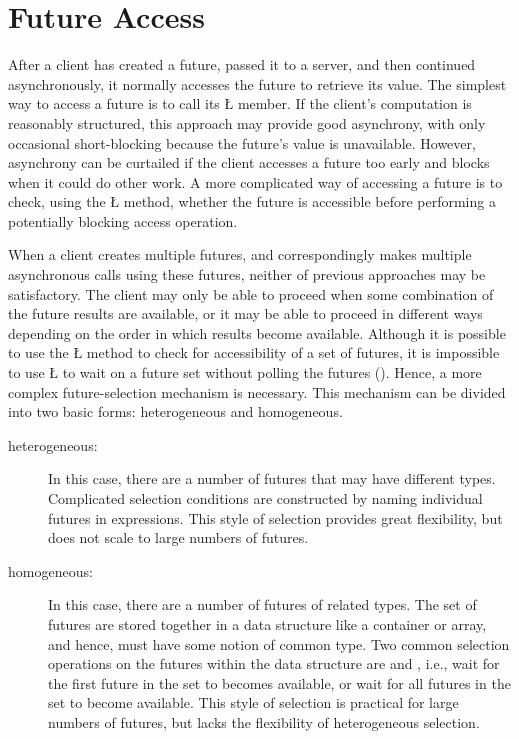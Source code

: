 \documentclass[openright,twoside]{report}
\begin{document}
\section{Future Access}

After a client has created a future, passed it to a server, and then continued asynchronously, it normally accesses the future to retrieve its value.
The simplest way to access a future is to call its \LGinlinetrue\LGbegin\lgrinde\L{}\endlgrinde\LGend{} member.
If the client's computation is reasonably structured, this approach may provide good asynchrony, with only occasional short-blocking because the future's value is unavailable.
However, asynchrony can be curtailed if the client accesses a future too early and blocks when it could do other work.
A more complicated way of accessing a future is to check, using the \LGinlinetrue\LGbegin\lgrinde\L{}\endlgrinde\LGend{} method, whether the future is accessible before performing a potentially blocking access operation.

When a client creates multiple futures, and correspondingly makes multiple asynchronous calls using these futures, neither of previous approaches may be satisfactory.
The client may only be able to proceed when some combination of the future results are available, or it may be able to proceed in different ways depending on the order in which results become available.
Although it is possible to use the \LGinlinetrue\LGbegin\lgrinde\L{}\endlgrinde\LGend{} method to check for accessibility of a set of futures, it is impossible to use \LGinlinetrue\LGbegin\lgrinde\L{}\endlgrinde\LGend{} to wait on a future set without polling the futures ().
Hence, a more complex future-selection mechanism is necessary.
This mechanism can be divided into two basic forms: heterogeneous and homogeneous.

\begin{description}
\item[heterogeneous:]
In this case, there are a number of futures that may have different types.
Complicated selection conditions are constructed by naming individual futures in expressions.
This style of selection provides great flexibility, but does not scale to large numbers of futures.
\item[homogeneous:]
In this case, there are a number of futures of related types.
The set of futures are stored together in a data structure like a container or array, and hence, must have some notion of common type.
Two common selection operations on the futures within the data structure are  and , i.e., wait for the first future in the set to becomes available, or wait for all futures in the set to become available.
This style of selection is practical for large numbers of futures, but lacks the flexibility of heterogeneous selection.
\end{description}
\end{document}
